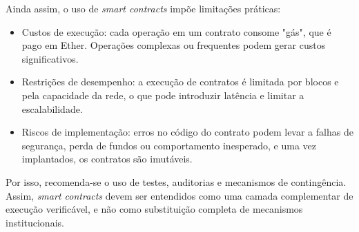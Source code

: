 Ainda assim, o uso de \emph{smart contracts} impõe limitações práticas:
\begin{itemize}
	\item Custos de execução: cada operação em um contrato consome "gás", que é pago em Ether. Operações complexas ou frequentes podem gerar custos significativos.
	\item Restrições de desempenho: a execução de contratos é limitada por blocos e pela capacidade da rede, o que pode introduzir latência e limitar a escalabilidade.
	\item Riscos de implementação: erros no código do contrato podem levar a falhas de segurança, perda de fundos ou comportamento inesperado, e uma vez implantados, os contratos são imutáveis.
\end{itemize}
Por isso, recomenda-se o uso de testes, auditorias e mecanismos de contingência. Assim, \emph{smart contracts}
devem ser entendidos como uma camada complementar de execução verificável, e não
como substituição completa de mecanismos institucionais.
